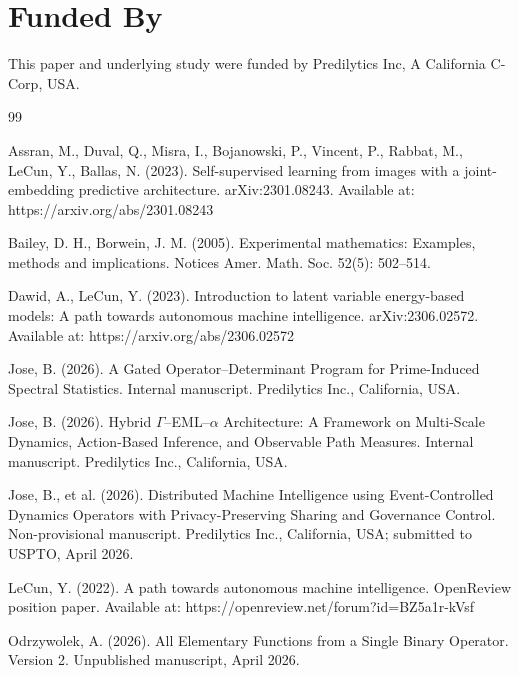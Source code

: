\documentclass[11pt]{article}
\begin{document}
\section{Funded By}
This paper and underlying study were funded by Predilytics Inc, A California C-Corp, USA.
\begin{thebibliography}{99}

Assran, M., Duval, Q., Misra, I., Bojanowski, P., Vincent, P., Rabbat, M., LeCun, Y., Ballas, N. (2023). Self-supervised learning from images with a joint-embedding predictive architecture. arXiv:2301.08243. Available at: https://arxiv.org/abs/2301.08243

Bailey, D. H., Borwein, J. M. (2005). Experimental mathematics: Examples, methods and implications. Notices Amer. Math. Soc. 52(5): 502--514.

Dawid, A., LeCun, Y. (2023). Introduction to latent variable energy-based models: A path towards autonomous machine intelligence. arXiv:2306.02572. Available at: https://arxiv.org/abs/2306.02572

Jose, B. (2026). A Gated Operator--Determinant Program for Prime-Induced Spectral Statistics. Internal manuscript. Predilytics Inc., California, USA.

Jose, B. (2026). Hybrid $\Gamma$--EML--$\alpha$ Architecture: A Framework on Multi-Scale Dynamics, Action-Based Inference, and Observable Path Measures. Internal manuscript. Predilytics Inc., California, USA.

Jose, B., et al. (2026). Distributed Machine Intelligence using Event-Controlled Dynamics Operators with Privacy-Preserving Sharing and Governance Control. Non-provisional manuscript. Predilytics Inc., California, USA; submitted to USPTO, April 2026.

LeCun, Y. (2022). A path towards autonomous machine intelligence. OpenReview position paper. Available at: https://openreview.net/forum?id=BZ5a1r-kVsf

Odrzywolek, A. (2026). All Elementary Functions from a Single Binary Operator. Version 2. Unpublished manuscript, April 2026.

\end{thebibliography}
\end{document}
